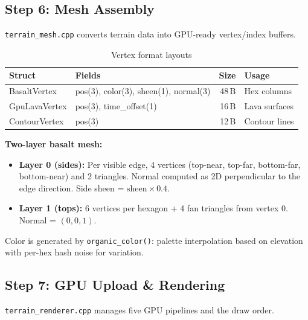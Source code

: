 \documentclass[11pt,a4paper]{article}
\begin{document}
\subsection{Step 6: Mesh Assembly}
\label{sec:mesh}

\texttt{terrain\_mesh.cpp} converts terrain data into GPU-ready vertex/index buffers.

\begin{table}[h]
\centering
\caption{Vertex format layouts}
\label{tab:vertices}
\begin{tabular}{@{}llrl@{}}
\toprule
\textbf{Struct} & \textbf{Fields} & \textbf{Size} & \textbf{Usage} \\
\midrule
BasaltVertex  & pos(3), color(3), sheen(1), normal(3) & 48\,B & Hex columns \\
GpuLavaVertex & pos(3), time\_offset(1) & 16\,B & Lava surfaces \\
ContourVertex & pos(3) & 12\,B & Contour lines \\
\bottomrule
\end{tabular}
\end{table}

\textbf{Two-layer basalt mesh:}
\begin{itemize}
  \item \textbf{Layer 0 (sides):} Per visible edge, 4 vertices (top-near, top-far, bottom-far, bottom-near) and 2 triangles. Normal computed as 2D perpendicular to the edge direction. Side sheen = $\text{sheen} \times 0.4$.
  \item \textbf{Layer 1 (tops):} 6 vertices per hexagon + 4 fan triangles from vertex 0. Normal = $(0, 0, 1)$.
\end{itemize}

Color is generated by \texttt{organic\_color()}: palette interpolation based on elevation with per-hex hash noise for variation.

\subsection{Step 7: GPU Upload \& Rendering}
\label{sec:terrain-render}

\texttt{terrain\_renderer.cpp} manages five GPU pipelines and the draw order.
\end{document}
